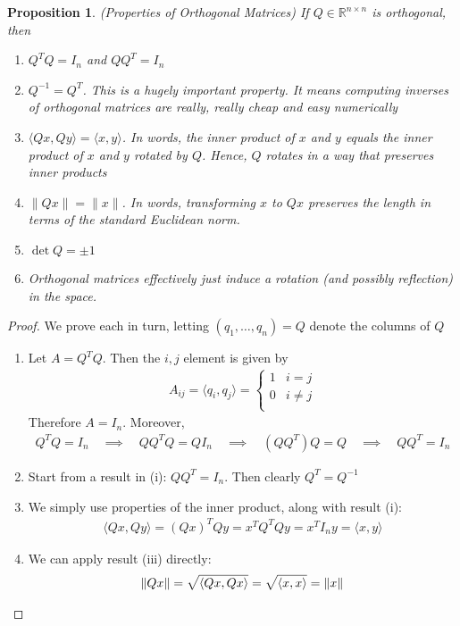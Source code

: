 \documentclass[12pt]{book}
\numberwithin{equation}{section} %
\theoremstyle{plain}
\newtheorem{prop}[thm]{Proposition}
\theoremstyle{definition}
\theoremstyle{remark}
\newcommand{\Rnn}{\mathbb{R}^{n\times n}}
\begin{document}
\begin{prop}\emph{(Properties of Orthogonal Matrices)}
If $Q\in\Rnn$ is orthogonal, then
\begin{enumerate}[label=\emph{(\roman*)}]
  \item $Q^TQ=I_n$ and $QQ^T=I_n$
  \item $Q^{-1}=Q^T$. This is a hugely important property. It means
    computing inverses of orthogonal matrices are really, really cheap
    and easy numerically
  \item $\langle Qx, Qy \rangle=\langle x, y \rangle$. In words,
    the inner product of $x$ and $y$ equals the inner product of $x$ and
    $y$ rotated by $Q$. Hence, $Q$ rotates in a way that preserves inner
    products
  \item $\lVert Qx \rVert =\lVert x\rVert$.
    In words, transforming $x$ to $Qx$ preserves the length in terms of
    the standard Euclidean norm.
  \item $\det Q = \pm 1$
  \item Orthogonal matrices effectively just induce a rotation (and
    possibly reflection) in the space.
\end{enumerate}
\end{prop}
\begin{proof}
We prove each in turn, letting $(q_1,\ldots,q_n)=Q$ denote the columns
of $Q$
\begin{enumerate}[label=(\roman*)]
  \item Let $A=Q^TQ$. Then the $i,j$ element is given by
    \begin{align*}
      A_{ij} = \langle q_i, q_j\rangle
      = \begin{cases}
          1 & i=j \\
          0 & i\neq j \\
        \end{cases}
    \end{align*}
    Therefore $A=I_n$. Moreover,
    \begin{align*}
      Q^TQ = I_n
      \quad\implies\quad
      QQ^TQ = Q I_n
      \quad\implies\quad
      (QQ^T)Q = Q
      \quad\implies\quad
      QQ^T=I_n
    \end{align*}

  \item
    Start from a result in (i): $QQ^T = I_n$. Then clearly
    $Q^T = Q^{-1}$
  \item
    We simply use properties of the inner product, along with result
    (i):
    \begin{align*}
      \langle Qx, Qy \rangle
      =
      (Qx)^T Qy
      = x^T Q^TQ y = x^T I_n y = \langle x, y\rangle
    \end{align*}
  \item
    We can apply result (iii) directly:
    \begin{align*}
      \lVert Qx\rVert
      =
      \sqrt{%
      \langle Qx,Qx\rangle
      }
      =
      \sqrt{%
      \langle x,x\rangle
      }
      = \lVert x\rVert
    \end{align*}
\end{enumerate}
\end{proof}
\end{document}
